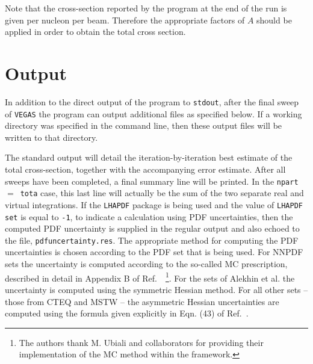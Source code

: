 \documentclass[12pt]{article}
\begin{document}
Note that the cross-section reported by the program at the end
of the run is given per nucleon per beam. Therefore the
appropriate factors of $A$ should be applied in order to obtain
the total cross section.

\section{Output}
\label{sec:output}

In addition to the direct output of the program to {\tt stdout}, after
the final sweep of {\tt VEGAS} the program can output additional files
as specified below.
If a working directory was specified in the command line, then these
output files will be written to that directory.

The standard output will detail the iteration-by-iteration best estimate
of the total cross-section, together with the accompanying error estimate.
After all sweeps have been completed, a final summary line will be printed.
In the {\tt npart}~$=$~{\tt tota} case, this last line will actually be the
sum of the two separate real and virtual integrations.
If the {\tt LHAPDF} package is being used and the value of
{\tt LHAPDF set} is equal to {\tt -1},  to indicate a calculation using
PDF uncertainties, then the computed PDF uncertainty is
supplied in the regular output and also echoed to the file,
{\tt pdfuncertainty.res}. The appropriate method for computing the PDF
uncertainties is chosen according to the PDF set that is being used.
For NNPDF sets the uncertainty is computed according to the so-called
MC prescription, described in detail in Appendix B of
Ref.~\cite{Ball:2008by}~\footnote{
The authors thank M. Ubiali and collaborators for providing their
implementation of the MC method within the \MCFM framework.}.
For the sets of Alekhin et al. the uncertainty is computed using the
symmetric Hessian method.  For all other sets -- those from CTEQ and
MSTW -- the asymmetric Hessian uncertainties are computed using
the formula given explicitly in
Eqn. (43) of Ref.~\cite{Campbell:2006wx}.
\end{document}
